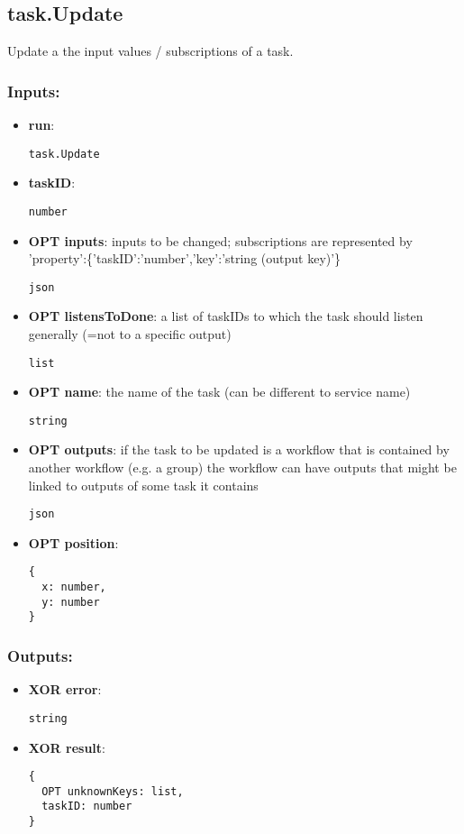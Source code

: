 \subsection{task.Update}
\label{ch:builtinservices:task.Update}
Update a the input values / subscriptions of a task.
\subsubsection*{Inputs:}
\begin{itemize}
    \item \textbf{run}: 
\begin{lstlisting}
task.Update
\end{lstlisting}
    \item \textbf{taskID}: 
\begin{lstlisting}
number
\end{lstlisting}
    \item \textbf{OPT inputs}: inputs to be changed; subscriptions are represented by 'property':\{'taskID':'number','key':'string (output key)'\}
\begin{lstlisting}
json
\end{lstlisting}
    \item \textbf{OPT listensToDone}: a list of taskIDs to which the task should listen generally (=not to a specific output)
\begin{lstlisting}
list
\end{lstlisting}
    \item \textbf{OPT name}: the name of the task (can be different to service name)
\begin{lstlisting}
string
\end{lstlisting}
    \item \textbf{OPT outputs}: if the task to be updated is a workflow that is contained by another  workflow (e.g. a group) the workflow can have outputs that might be  linked to outputs of some task it contains
\begin{lstlisting}
json
\end{lstlisting}
    \item \textbf{OPT position}: 
\begin{lstlisting}
{
  x: number, 
  y: number
}
\end{lstlisting}
  \end{itemize}

\subsubsection*{Outputs:}
\begin{itemize}
    \item \textbf{XOR error}: 
\begin{lstlisting}
string
\end{lstlisting}
    \item \textbf{XOR result}: 
\begin{lstlisting}
{
  OPT unknownKeys: list, 
  taskID: number
}
\end{lstlisting}
  \end{itemize}

